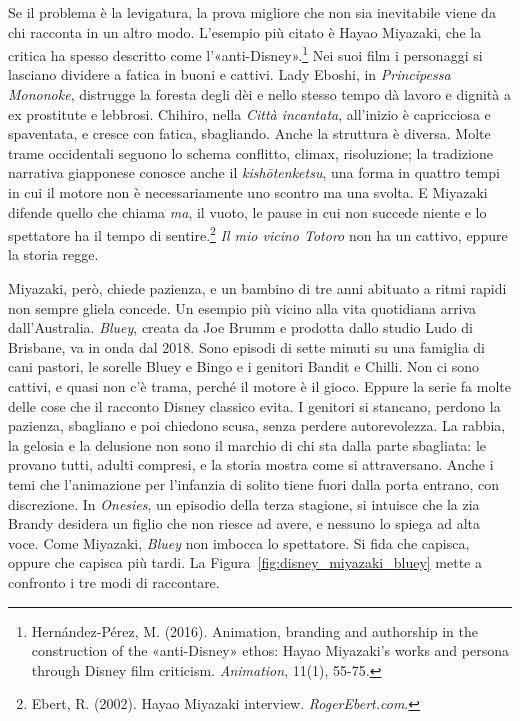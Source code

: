 Se il problema è la levigatura, la prova migliore che non sia inevitabile viene da chi racconta in un altro modo. L'esempio più citato è Hayao Miyazaki, che la critica ha spesso descritto come l'«anti-Disney».\footnote{Hernández-Pérez, M. (2016). Animation, branding and authorship in the construction of the «anti-Disney» ethos: Hayao Miyazaki's works and persona through Disney film criticism. \textit{Animation}, 11(1), 55-75.} Nei suoi film i personaggi si lasciano dividere a fatica in buoni e cattivi. Lady Eboshi, in \textit{Principessa Mononoke}, distrugge la foresta degli dèi e nello stesso tempo dà lavoro e dignità a ex prostitute e lebbrosi. Chihiro, nella \textit{Città incantata}, all'inizio è capricciosa e spaventata, e cresce con fatica, sbagliando. Anche la struttura è diversa. Molte trame occidentali seguono lo schema conflitto, climax, risoluzione; la tradizione narrativa giapponese conosce anche il \textit{kishōtenketsu}, una forma in quattro tempi in cui il motore non è necessariamente uno scontro ma una svolta. E Miyazaki difende quello che chiama \textit{ma}, il vuoto, le pause in cui non succede niente e lo spettatore ha il tempo di sentire.\footnote{Ebert, R. (2002). Hayao Miyazaki interview. \textit{RogerEbert.com}.} \textit{Il mio vicino Totoro} non ha un cattivo, eppure la storia regge.

Miyazaki, però, chiede pazienza, e un bambino di tre anni abituato a ritmi rapidi non sempre gliela concede. Un esempio più vicino alla vita quotidiana arriva dall'Australia. \textit{Bluey}, creata da Joe Brumm e prodotta dallo studio Ludo di Brisbane, va in onda dal 2018. Sono episodi di sette minuti su una famiglia di cani pastori, le sorelle Bluey e Bingo e i genitori Bandit e Chilli. Non ci sono cattivi, e quasi non c'è trama, perché il motore è il gioco. Eppure la serie fa molte delle cose che il racconto Disney classico evita. I genitori si stancano, perdono la pazienza, sbagliano e poi chiedono scusa, senza perdere autorevolezza. La rabbia, la gelosia e la delusione non sono il marchio di chi sta dalla parte sbagliata: le provano tutti, adulti compresi, e la storia mostra come si attraversano. Anche i temi che l'animazione per l'infanzia di solito tiene fuori dalla porta entrano, con discrezione. In \textit{Onesies}, un episodio della terza stagione, si intuisce che la zia Brandy desidera un figlio che non riesce ad avere, e nessuno lo spiega ad alta voce. Come Miyazaki, \textit{Bluey} non imbocca lo spettatore. Si fida che capisca, oppure che capisca più tardi. La Figura~\ref{fig:disney_miyazaki_bluey} mette a confronto i tre modi di raccontare.


